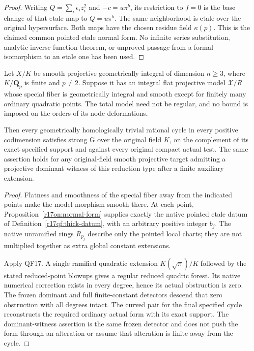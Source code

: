 \begin{proof}
Writing $Q=\sum_i\epsilon_i z_i^2$ and
$-c=u\pi^b$, its restriction to $f=0$ is the
base change of that etale map to $Q=u\pi^b$.
The same neighborhood is etale over the original
hypersurface. Both maps have the chosen residue
field $\kappa(p)$. This is the claimed common
pointed etale normal form.
No infinite series substitution, analytic inverse
function theorem, or unproved passage from a formal
isomorphism to an etale one has been used.
\end{proof}

\begin{theorem}
\label{r17on:actual}
Let $X/K$ be smooth projective geometrically integral
of dimension $n\ge3$, where $K/\mathbf Q_p$ is finite
and $p\ne2$. Suppose it has an integral flat projective
model $\mathcal X/R$ whose special fiber is geometrically
integral and smooth except for finitely many ordinary
quadratic points. The total model need not be regular,
and no bound is imposed on the orders of its node
deformations.

Then every geometrically homologically trivial rational
cycle in every positive codimension satisfies strong G
over the original field $K$, on the complement of its
exact specified support and against every original compact
actual test.
The same assertion holds for any original-field smooth
projective target admitting a projective dominant witness
of this reduction type after a finite auxiliary extension.
\end{theorem}

\begin{proof}
Flatness and smoothness of the special fiber away from
the indicated points make the model morphism smooth
there. At each point, Proposition~\ref{r17on:normal-form}
supplies exactly the native pointed etale datum of
Definition~\ref{r17qf:thick-datum}, with an arbitrary
positive integer $b_j$. The native unramified rings
$R_{p_j}$ describe only the pointed local charts;
they are not multiplied together as extra global
constant extensions.

Apply QF17. A single ramified quadratic extension
$K(\sqrt\pi)/K$ followed by the stated reduced-point
blowups gives a regular reduced quadric forest.
Its native numerical correction exists in every
degree, hence its actual obstruction is zero.
The frozen dominant and full finite-constant
detectors descend that zero obstruction with all
degrees intact. The curved pair for the final
specified cycle reconstructs the required ordinary
actual form with its exact support.
The dominant-witness assertion is the same frozen
detector and does not push the form through an
alteration or assume that alteration is finite
away from the cycle.
\end{proof}

